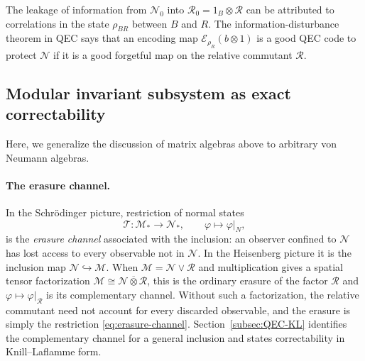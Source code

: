 \documentclass[a4paper,11pt]{article}
\theoremstyle{definition}
\newcommand{\mE}{\mathcal{E}}
\begin{document}
The leakage of information from $\mathcal N_0$ into $\mathcal R_0=1_B\otimes \mathcal R$ can be attributed to correlations in the state $\rho_{BR}$ between $B$ and $R$. The information-disturbance theorem in QEC says that an encoding map $\mE_{\rho_R}(b\otimes 1)$ is a good QEC code to protect $\mathcal N$ if it is a good forgetful map on the relative commutant $\mathcal R$. 



\subsection{Modular invariant subsystem as exact correctability}\label{subsec:QEC-takesaki}

Here, we generalize the discussion of matrix algebras above to arbitrary von Neumann algebras. 

\paragraph{The erasure channel.}
In the Schr\"odinger picture, restriction of normal states
\begin{equation}
 \mathcal T:\mathcal M_*\to\mathcal N_*,\qquad \varphi\mapsto\varphi|_N,
 \label{eq:erasure-channel}
\end{equation}
is the \emph{erasure channel} associated with the inclusion: an observer confined to $\mathcal N$ has lost access to every observable not in $\mathcal N$. In the Heisenberg picture it is the inclusion map $\mathcal N\hookrightarrow\mathcal M$. When $\mathcal M=\mathcal N\vee\mathcal R$ and multiplication gives a spatial tensor factorization $\mathcal M\cong\mathcal N\overline\otimes\mathcal R$, this is the ordinary erasure of the factor $\mathcal R$ and $\varphi\mapsto\varphi|_{\mathcal R}$ is its complementary channel. Without such a factorization, the relative commutant need not account for every discarded observable, and the erasure is simply the restriction \eqref{eq:erasure-channel}. Section~\ref{subsec:QEC-KL} identifies the complementary channel for a general inclusion and states correctability in Knill--Laflamme form.
\end{document}
